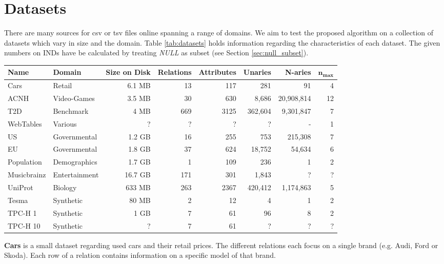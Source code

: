 \section{Datasets}
There are many sources for csv or tsv files online spanning a range of domains. We aim to test the proposed algorithm on a collection of datasets which vary in size and the domain. Table \ref{tab:datasets} holds information regarding the characteristics of each dataset. The given numbers on INDs have be calculated by treating \textit{NULL} as subset (see Section \ref{sec:null_subset}).

\begin{table*}[t]
    \centering
    \begin{tabular}{llrrrrrr}
        \hline
        \textbf{Name} & \textbf{Domain} & \textbf{Size on Disk} & \textbf{Relations} & \textbf{Attributes} & \textbf{Unaries} & \textbf{N-aries} & $\textbf{n}_\textbf{max}$ \\
        \hline
        Cars & Retail & 6.1 MB & 13 & 117 & 281 & 91 & 4 \\
        ACNH & Video-Games & 3.5 MB & 30 & 630 & 8,686 & 20,908,814 & 12 \\
        T2D & Benchmark & 4 MB & 669 & 3125 & 362,604 & 9,301,847 & 7 \\
        WebTables & Various & ? & ? & ? & ? & - & 1 \\
        US & Governmental & 1.2 GB & 16 & 255 & 753 & 215,308 & 7 \\
        EU & Governmental & 1.8 GB & 37 & 624 & 18,752 & 54,634 & 6 \\
        Population & Demographics & 1.7 GB & 1 & 109 & 236 & 1 & 2 \\
        Musicbrainz & Entertainment & 16.7 GB & 171 & 301 & 1,843 &  ? & ? \\
        UniProt & Biology & 633 MB & 263 & 2367 & 420,412 & 1,174,863 & 5 \\
        Tesma & Synthetic & 80 MB & 2 & 12 & 4 & 1 & 2 \\
        TPC-H 1 & Synthetic & 1 GB & 7 & 61 & 96 & 8 & 2 \\
        TPC-H 10 & Synthetic & ? & 7 & 61 & ? & ? & ? \\
        \hline
    \end{tabular}
    \caption{Datasets and their characteristics}
    \label{tab:datasets}
\end{table*}
\textbf{Cars} is a small dataset regarding used cars and their retail prices. The different relations each focus on a single brand (e.g. Audi, Ford or Skoda). Each row of a relation contains information on a specific model of that brand.

